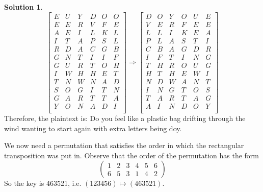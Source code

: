 \documentclass[11pt]{amsart}
\theoremstyle{definition}\newtheorem{definition}{Definition}
\theoremstyle{definition}\newtheorem{question}{Question}
\theoremstyle{definition}\newtheorem*{solution}{Solution}
\begin{document}
\begin{solution}
    \begin{equation*}
        \begin{bmatrix}
            E & U & Y & D & O & O \\
            E & E & R & V & F & E \\
            A & E & I & L & K & L \\
            I & T & A & P & S & L \\
            R & D & A & C & G & B \\
            G & N & T & I & I & F \\
            G & U & R & T & O & H \\
            I & W & H & H & E & T \\
            T & N & W & N & A & D \\
            S & O & G & I & T & N \\
            G & A & R & T & T & A \\
            Y & O & N & A & D & I \\
        \end{bmatrix} \Rightarrow \begin{bmatrix}
            D & O & Y & O & U & E \\
            V & E & R & F & E & E \\
            L & L & I & K & E & A \\
            P & L & A & S & T & I \\
            C & B & A & G & D & R \\
            I & F & T & I & N & G \\
            T & H & R & O & U & G \\
            H & T & H & E & W & I \\
            N & D & W & A & N & T \\
            I & N & G & T & O & S \\
            T & A & R & T & A & G \\
            A & I & N & D & O & Y \\
        \end{bmatrix}
    \end{equation*}
    Therefore, the plaintext is: \textsf{Do you feel like a plastic bag drifting through the wind wanting to start again} with extra letters being \textsf{doy}.

    We now need a permutation that satisfies the order in which the rectangular transposition was put in. Observe that the order of the permutation has the form
    \begin{equation*}
        \begin{pmatrix}
            1 & 2 & 3 & 4 & 5 & 6 \\
            6 & 5 & 3 & 1 & 4 & 2
        \end{pmatrix}
    \end{equation*}
    So the key is 463521, i.e. $(123456) \mapsto (463521)$.
\end{solution}
\end{document}
